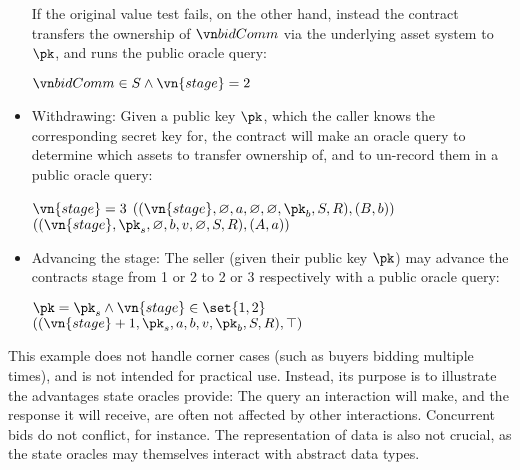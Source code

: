 \begin{itemize}
    If the original value test fails, on the other hand, instead
    the contract transfers the ownership of $\bidcomm$ via the underlying asset
    system to $\pk$, and runs the public oracle query:
    \begin{algorithmic}
        \State \Assert $\bidcomm \in S \land \vn{stage} = 2$
      \EndFunction
    \end{algorithmic}
  \item Withdrawing: Given a public key $\pk$, which the caller knows the
    corresponding secret key for, the contract will make an oracle query to
    determine which assets to transfer ownership of, and to un-record them in a
    public oracle query:
    \begin{algorithmic}
        \State \Assert $\vn{stage} = 3$
          \State \Return $((\vn{stage}, \varnothing, a, \varnothing, \varnothing, \pk_b, S,
          R),(B, b))$
          \State \Return $((\vn{stage}, \pk_s, \varnothing, b, v, \varnothing, S, R),(A, a))$
        \EndIf
      \EndFunction
    \end{algorithmic}
  \item Advancing the stage: The seller (given their public key $\pk$) may
    advance the contracts stage from 1 or 2 to 2 or 3 respectively with a public
    oracle query:
    \begin{algorithmic}
        \State \Assert $\pk = \pk_s \land \vn{stage} \in \set{1, 2}$
        \State \Return $((\vn{stage} + 1, \pk_s, a, b, v, \pk_b, S, R), \top)$
      \EndFunction
    \end{algorithmic}
\end{itemize}

This example does not handle corner cases (such as buyers bidding multiple
times), and is not intended for practical use. Instead, its purpose is to
illustrate the advantages state oracles provide: The query an interaction will
make, and the response it will receive, are often not affected by other
interactions. Concurrent bids do not conflict, for instance. The representation
of data is also not crucial, as the state oracles may themselves interact with
abstract data types.

